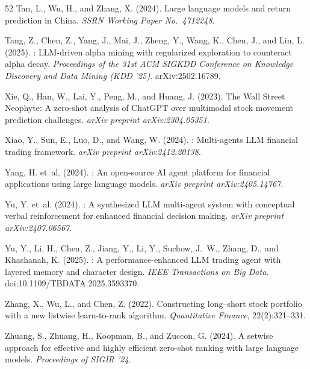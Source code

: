 {\begin{thebibliography}{52}
Tan, L., Wu, H., and Zhang, X. (2024).
\newblock Large language models and return prediction in {China}.
\newblock \emph{SSRN Working Paper No.\ 4712248}.

Tang, Z., Chen, Z., Yang, J., Mai, J., Zheng, Y., Wang, K., Chen, J., and Lin, L. (2025).
: {LLM}-driven alpha mining with regularized exploration to counteract alpha decay.
\newblock \emph{Proceedings of the 31st ACM SIGKDD Conference on Knowledge Discovery and Data Mining (KDD '25)}. arXiv:2502.16789.

Xie, Q., Han, W., Lai, Y., Peng, M., and Huang, J. (2023).
\newblock The {W}all {S}treet {N}eophyte: A zero-shot analysis of {ChatGPT} over multimodal stock movement prediction challenges.
\newblock \emph{arXiv preprint arXiv:2304.05351}.

Xiao, Y., Sun, E., Luo, D., and Wang, W. (2024).
: Multi-agents {LLM} financial trading framework.
\newblock \emph{arXiv preprint arXiv:2412.20138}.

Yang, H. et~al. (2024).
: An open-source {AI} agent platform for financial applications using large language models.
\newblock \emph{arXiv preprint arXiv:2405.14767}.

Yu, Y. et~al. (2024).
: A synthesized {LLM} multi-agent system with conceptual verbal reinforcement for enhanced financial decision making.
\newblock \emph{arXiv preprint arXiv:2407.06567}.

Yu, Y., Li, H., Chen, Z., Jiang, Y., Li, Y., Suchow, J.~W., Zhang, D., and Khashanah, K. (2025).
: A performance-enhanced {LLM} trading agent with layered memory and character design.
\newblock \emph{IEEE Transactions on Big Data}. doi:10.1109/TBDATA.2025.3593370.

Zhang, X., Wu, L., and Chen, Z. (2022).
\newblock Constructing long--short stock portfolio with a new listwise learn-to-rank algorithm.
\newblock \emph{Quantitative Finance}, 22(2):321--331.

Zhuang, S., Zhuang, H., Koopman, B., and Zuccon, G. (2024).
\newblock A setwise approach for effective and highly efficient zero-shot ranking with large language models.
\newblock \emph{Proceedings of SIGIR '24}.

\end{thebibliography}
}

